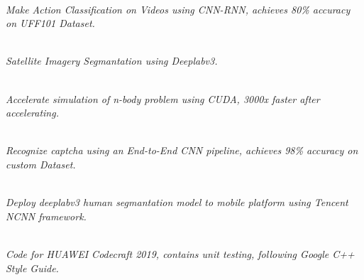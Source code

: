 \documentclass[10pt]{article}
\begin{document}
		\begin{adjustwidth}{0.1cm}{0cm}
			\\
				\textit{Make Action Classification on Videos using CNN-RNN, achieves 80\% accuracy on UFF101 Dataset.}

			\vspace{0.1cm}
			\\
				\textit{Satellite Imagery Segmantation using Deeplabv3.}

			\vspace{0.1cm}
			\\
				\textit{Accelerate simulation of n-body problem using CUDA, 3000x faster after accelerating.}
			
			\vspace{0.1cm}
			\\
				\textit{Recognize captcha using an End-to-End CNN pipeline, achieves 98\% accuracy on custom Dataset.}
			
			\vspace{0.1cm}
			\\
				\textit{Deploy deeplabv3 human segmantation model to mobile platform using Tencent NCNN framework.}
			
			\vspace{0.1cm}
			\\
				\textit{Code for HUAWEI Codecraft 2019, contains unit testing, following Google C++ Style Guide.}
		\end{adjustwidth}
\end{document}
